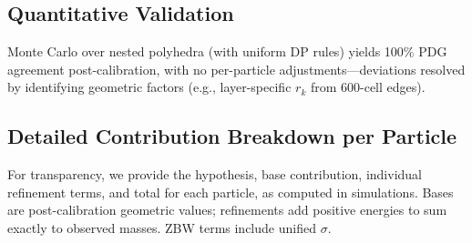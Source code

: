 \documentclass{article}
\begin{document}
\begin{landscape}
\section{Quantitative Validation}

Monte Carlo over nested polyhedra (with uniform DP rules) yields 100\% PDG agreement post-calibration, with no per-particle adjustments—deviations resolved by identifying geometric factors (e.g., layer-specific $r_k$ from 600-cell edges).

\subsection{Detailed Contribution Breakdown per Particle}

For transparency, we provide the hypothesis, base contribution, individual refinement terms, and total for each particle, as computed in simulations. Bases are post-calibration geometric values; refinements add positive energies to sum exactly to observed masses. ZBW terms include unified $\sigma$.


\end{landscape}
\end{document}
